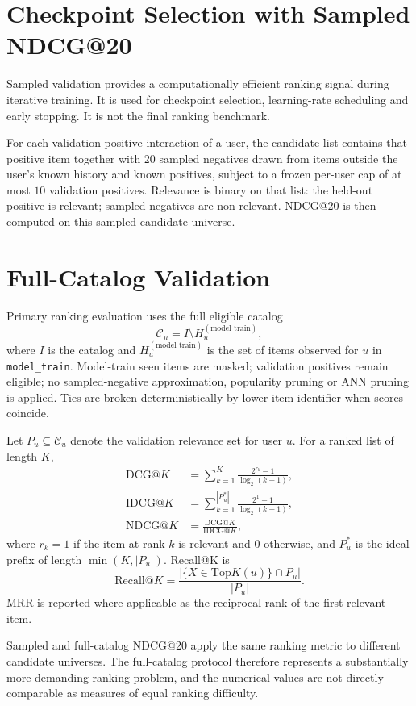 \section{Checkpoint Selection with Sampled NDCG@20}
\label{sec:lastfm-sampled-val}

Sampled validation provides a computationally efficient ranking signal during iterative training.
It is used for checkpoint selection, learning-rate scheduling and early stopping.
It is not the final ranking benchmark.

For each validation positive interaction of a user, the candidate list contains that positive item together with $20$ sampled negatives drawn from items outside the user's known history and known positives, subject to a frozen per-user cap of at most $10$ validation positives.
Relevance is binary on that list: the held-out positive is relevant; sampled negatives are non-relevant.
NDCG@20 is then computed on this sampled candidate universe.

\section{Full-Catalog Validation}
\label{sec:lastfm-fullcatalog}

Primary ranking evaluation uses the full eligible catalog
\begin{equation}
\label{eq:lastfm-Cu}
\mathcal{C}_u=I\setminus H_u^{(\mathrm{model\_train})},
\end{equation}
where $I$ is the catalog and $H_u^{(\mathrm{model\_train})}$ is the set of items observed for $u$ in \texttt{model\_train}.
Model-train seen items are masked; validation positives remain eligible; no sampled-negative approximation, popularity pruning or ANN pruning is applied.
Ties are broken deterministically by lower item identifier when scores coincide.

Let $P_u\subseteq\mathcal{C}_u$ denote the validation relevance set for user $u$.
For a ranked list of length $K$,
\begin{align}
\mathrm{DCG@}K
&=
\sum_{k=1}^{K}\frac{2^{r_k}-1}{\log_2(k+1)},
\label{eq:lastfm-dcg}\\
\mathrm{IDCG@}K
&=
\sum_{k=1}^{|P_u^{\ast}|}\frac{2^{1}-1}{\log_2(k+1)},
\label{eq:lastfm-idcg}\\
\mathrm{NDCG@}K
&=
\frac{\mathrm{DCG@}K}{\mathrm{IDCG@}K},
\label{eq:lastfm-ndcg}
\end{align}
where $r_k=1$ if the item at rank $k$ is relevant and $0$ otherwise, and $P_u^{\ast}$ is the ideal prefix of length $\min(K,|P_u|)$.
Recall@K is
\begin{equation}
\label{eq:lastfm-recall}
\mathrm{Recall@}K
=
\frac{|\{X\in\mathrm{Top}K(u)\}\cap P_u|}{|P_u|}.
\end{equation}
MRR is reported where applicable as the reciprocal rank of the first relevant item.

Sampled and full-catalog NDCG@20 apply the same ranking metric to different candidate universes.
The full-catalog protocol therefore represents a substantially more demanding ranking problem, and the numerical values are not directly comparable as measures of equal ranking difficulty.
